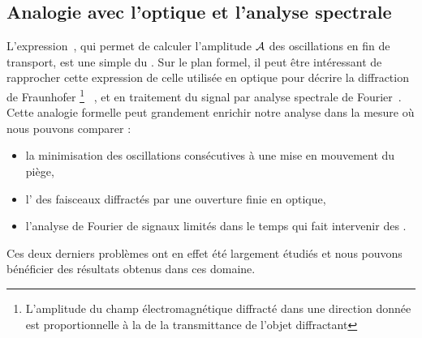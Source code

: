 \casse

\subsection{Analogie avec l'optique et l'analyse spectrale}
L'expression~, qui permet de calculer l'amplitude ${\mathcal{A}}$ des oscillations en fin de transport, est une simple \tf du \pacc. Sur le plan formel, il peut être intéressant de rapprocher cette expression de celle utilisée en optique pour décrire la diffraction de Fraunhofer%
\footnote{L'amplitude du champ électromagnétique diffracté dans une direction donnée est proportionnelle à la \tf de la transmittance de l'objet diffractant}%
~\cite{Goo05}, et en traitement du signal par analyse spectrale de Fourier~\cite{Har78}.
%
Cette analogie formelle peut grandement enrichir notre analyse dans la mesure où nous pouvons comparer :
\begin{itemize}
	\item la minimisation des oscillations consécutives à une mise en mouvement du piège,
	\item l' des faisceaux diffractés par une ouverture finie en optique,
	\item l'analyse de Fourier de signaux limités dans le temps qui fait intervenir des .
\end{itemize}
Ces deux derniers problèmes ont en effet été largement étudiés et nous pouvons bénéficier des résultats obtenus dans ces domaine.

{\AjouteLigne}
\RemonteUnPeuFig
\RemonteUnPeuFig


